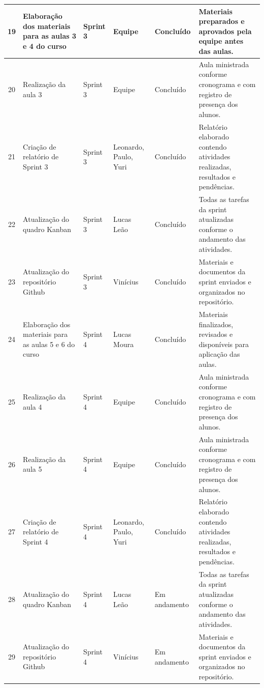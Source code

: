\documentclass[12pt,a4paper]{article}
\begin{document}
\begin{longtable}{|c|p{3.8cm}|p{1.9cm}|p{2.2cm}|p{1.7cm}|p{4.2cm}|}
19 & Elaboração dos materiais para as aulas 3 e 4 do curso & Sprint 3 & Equipe & Concluído & Materiais preparados e aprovados pela equipe antes das aulas. \\ \hline

20 & Realização da aula 3 & Sprint 3 & Equipe & Concluído & Aula ministrada conforme cronograma e com registro de presença dos alunos. \\ \hline

21 & Criação de relatório de Sprint 3 & Sprint 3 & Leonardo, Paulo, Yuri & Concluído & Relatório elaborado contendo atividades realizadas, resultados e pendências. \\ \hline

22 & Atualização do quadro Kanban & Sprint 3 & Lucas Leão & Concluído & Todas as tarefas da sprint atualizadas conforme o andamento das atividades. \\ \hline

23 & Atualização do repositório Github & Sprint 3 & Vinícius & Concluído & Materiais e documentos da sprint enviados e organizados no repositório. \\ \hline

24 & Elaboração dos materiais para as aulas 5 e 6 do curso & Sprint 4 & Lucas Moura & Concluído & Materiais finalizados, revisados e disponíveis para aplicação das aulas. \\ \hline

25 & Realização da aula 4 & Sprint 4 & Equipe & Concluído & Aula ministrada conforme cronograma e com registro de presença dos alunos. \\ \hline

26 & Realização da aula 5 & Sprint 4 & Equipe & Concluído & Aula ministrada conforme cronograma e com registro de presença dos alunos. \\ \hline

27 & Criação de relatório de Sprint 4 & Sprint 4 & Leonardo, Paulo, Yuri & Concluído & Relatório elaborado contendo atividades realizadas, resultados e pendências. \\ \hline

28 & Atualização do quadro Kanban & Sprint 4 & Lucas Leão & Em andamento & Todas as tarefas da sprint atualizadas conforme o andamento das atividades. \\ \hline

29 & Atualização do repositório Github & Sprint 4 & Vinícius & Em andamento & Materiais e documentos da sprint enviados e organizados no repositório. \\ \hline


\end{longtable}
\end{document}
